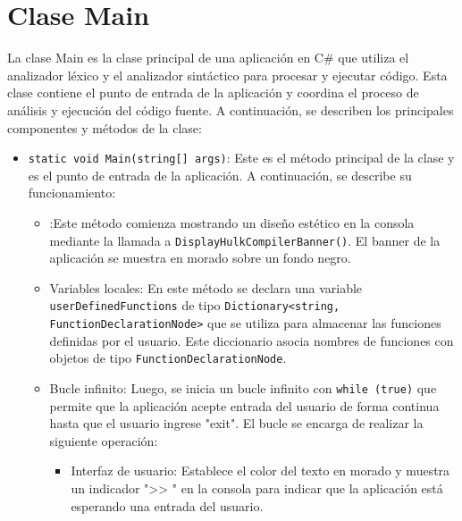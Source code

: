 \documentclass{article}
\begin{document}
\section{Clase \textcolor{classcolor}{Main}}
La clase \textcolor{classcolor}{Main} es la clase principal de una aplicación en C\# que utiliza el analizador léxico y el analizador sintáctico para procesar y ejecutar código. Esta clase contiene el punto de entrada de la aplicación y coordina el proceso de análisis y ejecución del código fuente. A continuación, se describen los principales componentes y métodos de la clase:

\begin{itemize}[left=0pt]
    \item \textcolor{fieldcolor}{\lstinline{static void Main(string[] args)}}: Este es el método principal de la clase y es el punto de entrada de la aplicación. A continuación, se describe su funcionamiento:

    \begin{itemize}
        \item \textcolor{commentcolor}{}:Este método comienza mostrando un diseño estético en la consola mediante la llamada a \textcolor{methodcolor}{\lstinline{DisplayHulkCompilerBanner()}}. El banner de la aplicación se muestra en morado sobre un fondo negro.

        \item \textcolor{commentcolor}{Variables locales}: En este método se declara una variable \textcolor{fieldcolor}{\lstinline{userDefinedFunctions}} de tipo \textcolor{fieldcolor}{\lstinline{Dictionary<string, FunctionDeclarationNode>}} que se utiliza para almacenar las funciones definidas por el usuario. Este diccionario asocia nombres de funciones con objetos de tipo \textcolor{classcolor}{\lstinline{FunctionDeclarationNode}}.

        \item \textcolor{commentcolor}{Bucle infinito}: Luego, se inicia un bucle infinito con \textcolor{fieldcolor}{\lstinline{while (true)}} que permite que la aplicación acepte entrada del usuario de forma continua hasta que el usuario ingrese "exit". El bucle se encarga de realizar la siguiente operación:

        \begin{itemize}
            \item \textcolor{commentcolor}{Interfaz de usuario}: Establece el color del texto en morado y muestra un indicador ">> " en la consola para indicar que la aplicación está esperando una entrada del usuario.


\end{itemize}
\end{itemize}
\end{itemize}
\end{document}
